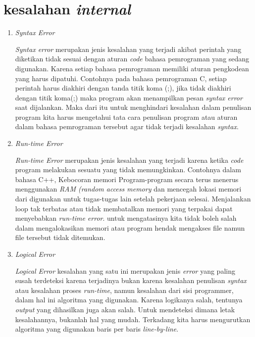 \section{kesalahan \textit{internal}}
\begin{enumerate}
\item \textit{Syntax Error}
\par 
\textit{Syntax error} merupakan jenis kesalahan yang terjadi akibat perintah yang diketikan tidak sesuai dengan aturan \textit{code} bahasa pemrograman yang sedang digunakan. Karena setiap bahasa pemrograman memiliki aturan pengkodean yang harus dipatuhi. Contohnya pada bahasa pemrograman C, setiap perintah harus diakhiri dengan tanda titik koma (;), jika tidak diakhiri dengan titik koma(;) maka program akan menampilkan pesan \textit{syntax error} saat dijalankan. Maka dari itu untuk menghindari kesalahan dalam penulisan program kita harus mengetahui tata cara penulisan program atau aturan dalam bahasa pemrograman tersebut agar tidak terjadi kesalahan \textit{syntax}.

\item \textit{Run-time Error}
\par
\textit{Run-time Error} merupakan jenis kesalahan yang terjadi karena ketika \textit{code} program melakukan sesuatu yang tidak memungkinkan. Contohnya dalam bahasa C++, Kebocoran memori Program-program secara terus menerus menggunakan \textit{RAM (random access memory} dan mencegah lokasi memori dari digunakan untuk tugas-tugas lain setelah pekerjaan selesai. Menjalankan loop tak terbatas atau tidak membatalkan memori yang terpakai dapat menyebabkan \textit{run-time error}. untuk mengatasinya kita tidak boleh salah dalam mengalokasikan memori atau program hendak mengakses file namun file tersebut tidak ditemukan.

\item \textit{Logical Error}
\par
\textit{Logical Error} kesalahan yang satu ini merupakan jenis \textit{error} yang paling susah terdeteksi karena terjadinya bukan karena kesalahan penulisan \textit{syntax} atau kesalahan proses \textit{run-time}, namun kesalahan dari sisi programmer, dalam hal ini algoritma yang digunakan. Karena logikanya salah, tentunya \textit{output} yang dihasilkan juga akan salah. Untuk mendeteksi dimana letak kesalahannya, bukanlah hal yang mudah. Terkadang kita harus mengurutkan algoritma yang digunakan baris per baris \textit{line-by-line}.
\end{enumerate}

